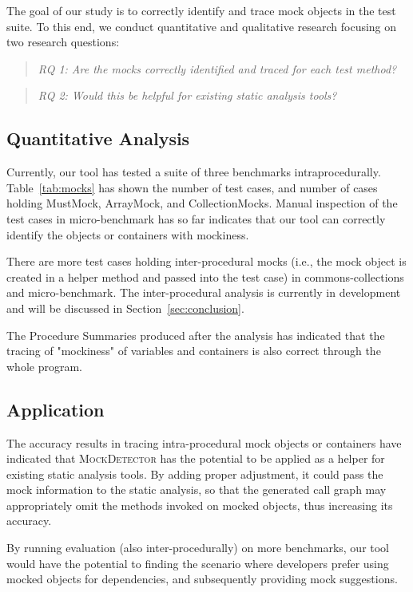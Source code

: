 The goal of our study is to correctly identify and trace mock objects in the test suite. To this end, we conduct quantitative and qualitative research focusing on two research questions:

\begin{quote}
	\emph{RQ 1: Are the mocks correctly identified and traced for each test method?}
\end{quote}

\begin{quote}
	\emph{RQ 2: Would this be helpful for existing static analysis tools?}
\end{quote}

\subsection{Quantitative Analysis}
\label{subsec:effectiveness}

Currently, our tool has tested a suite of three benchmarks intraprocedurally. Table~\ref{tab:mocks} has shown the number of test cases, and number of cases holding MustMock, ArrayMock, and CollectionMocks. Manual inspection of the test cases in micro-benchmark has so far indicates that our tool can correctly identify the objects or containers with mockiness. 

There are more test cases holding inter-procedural mocks (i.e., the mock object is created in a helper method and passed into the test case) in commons-collections and micro-benchmark. The inter-procedural analysis is currently in development and will be discussed in Section~\ref{sec:conclusion}.

The Procedure Summaries produced after the analysis has indicated that the tracing of "mockiness" of variables and containers is also correct through the whole program. 

\subsection{Application}
\label{subsec:static}

The accuracy results in tracing intra-procedural mock objects or containers have indicated that \textsc{MockDetector} has the potential to be applied as a helper for existing static analysis tools. By adding proper adjustment, it could pass the mock information to the static analysis, so that the generated call graph may appropriately omit the methods invoked on mocked objects, thus increasing its accuracy.

By running evaluation (also inter-procedurally) on more benchmarks, our tool would have the potential to finding the scenario where developers prefer using mocked objects for dependencies, and subsequently providing mock suggestions.